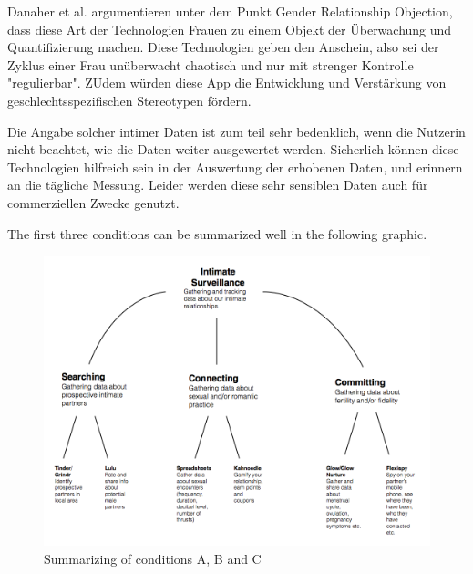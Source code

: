 Danaher et al. \cite{doi:10.1080/15265161.2017.1409823} argumentieren unter dem Punkt Gender Relationship Objection, dass diese Art der Technologien Frauen zu einem Objekt der Überwachung und Quantifizierung machen. Diese Technologien geben den Anschein, also sei der Zyklus einer Frau unüberwacht chaotisch und nur mit strenger Kontrolle "regulierbar".
ZUdem würden diese App die Entwicklung und Verstärkung von geschlechtsspezifischen Stereotypen fördern.

Die Angabe solcher intimer Daten ist zum teil sehr bedenklich, wenn die Nutzerin nicht beachtet, wie die Daten weiter ausgewertet werden. Sicherlich können diese Technologien hilfreich sein in der Auswertung der erhobenen Daten, und erinnern an die tägliche Messung. Leider werden diese sehr sensiblen Daten auch für commerziellen Zwecke genutzt. 



The first three conditions can be summarized well in the following graphic.
\begin{figure}[htb]
	\centering
	\includegraphics[width=\linewidth]{img/d372d-intimate2bsurveillance-122.png}
	\caption{Summarizing of conditions A, B and C \cite{ethicsOfSurveillance}}
	\label{fig:intimate_surveillance}
\end{figure}
